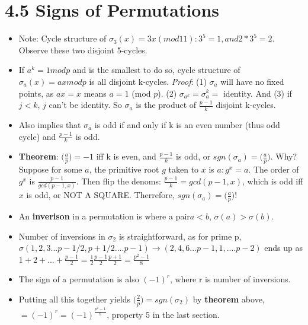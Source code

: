 \documentclass[11pt, oneside]{article}   	%
\begin{document}
\section{4.5 Signs of Permutations}
\begin{itemize}
\item Note: Cycle structure of $\sigma_3(x) = 3x (mod 11): 3^5 = 1, and 2*3^5=2$.  Observe these two disjoint 5-cycles.
\item If $a^k = 1 mod p$ and is the smallest to do so, cycle structure of $\sigma_a(x) = ax mod p$ is all disjoint k-cycles.  \emph{Proof}: (1) $\sigma_a$ will have no fixed points, as $ax = x$ means $a = 1$ (mod $p$).  (2) $\sigma_{a^k} = \sigma_a^k = $ identity.  And (3) if $j < k$, $j$ can't be identity.   So $\sigma_a$ is the product of $\frac{p-1}{k}$ disjoint k-cycles.
\item Also implies that $\sigma_a$ is odd if and only if k is an even number (thus odd cycle) and $\frac{p-1}{k}$ is odd.
\item \textbf{Theorem}: $\Big(\frac{a}{p}\Big)  = -1$ iff k is even, and $\frac{p-1}{k}$ is odd, or $sgn(\sigma_a) = \Big(\frac{a}{p}\Big)$. Why? Suppose for some $a$, the primitive root $g$ taken to $x$ is $a: g^x = a$.  The order of $g^x$ is $\frac{p-1}{gcd(p-1,x)}$.  Then flip the denoms: $\frac{p-1}{k} = gcd(p-1,x)$, which is odd iff $x$ is odd, or NOT A SQUARE.  Therrefore, $sgn(\sigma_a) = \Big(\frac{a}{p}\Big) $!
\item An \textbf{inverison} in a permutation is where a pair$a < b$, $\sigma(a) > \sigma(b)$.  
\item Number of inversions in $\sigma_2$ is straightforward, as for prime p, $\sigma(1, 2, 3 ... p-1/2, p+1/2 .... p-1) \rightarrow (2, 4, 6  ... p-1, 1, .... p-2)$ ends up as $ 1 + 2 + ... + \frac{p-1}{2} = \frac{1}{2} \frac{p-1}{2}\frac{p+1}{2} = \frac{p^2-1}{8}$
\item The sign of a permutation is also $(-1)^r$, where r is number of inversions.
\item Putting all this together yields $\Big(\frac{2}{p}\Big)  = sgn(\sigma_2)$ by \textbf{theorem} above, $ = (-1)^r = (-1)^\frac{p^2-1}{8}$, property 5 in the last section.
\end{itemize}
\end{document}
